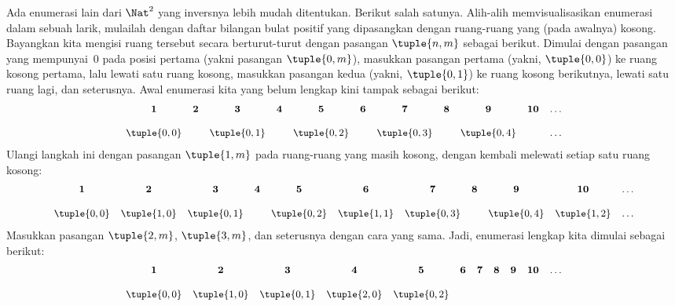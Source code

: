 \documentclass[../../../include/open-logic-section]{subfiles}
\begin{document}


\begin{explain}
Ada enumerasi lain dari $\Nat^2$ yang inversnya lebih mudah ditentukan. Berikut
salah satunya. Alih-alih memvisualisasikan enumerasi dalam sebuah larik,
mulailah dengan daftar bilangan bulat positif yang dipasangkan dengan
ruang-ruang yang (pada awalnya) kosong. Bayangkan kita mengisi ruang tersebut
secara berturut-turut dengan pasangan $\tuple{n,m}$ sebagai berikut. Dimulai
dengan pasangan yang mempunyai~$0$ pada posisi pertama (yakni pasangan
$\tuple{0,m}$), masukkan pasangan pertama (yakni, $\tuple{0,0}$) ke ruang
kosong pertama, lalu lewati satu ruang kosong, masukkan pasangan kedua (yakni,
$\tuple{0,1}$) ke ruang kosong berikutnya, lewati satu ruang lagi, dan
seterusnya. Awal enumerasi kita yang belum lengkap kini tampak sebagai berikut:
\[\small
\begin{array}{@{}c c c c c c c c c c c@{}}
\mathbf 1 & \mathbf 2 & \mathbf 3 & \mathbf 4 & \mathbf 5 & \mathbf 6 & \mathbf 7 & \mathbf 8 & \mathbf 9 & \mathbf{10} & \dots \\ \\
\tuple{0,0} &  & \tuple{0,1} &  & \tuple{0,2} &  & \tuple{0,3} & & \tuple{0,4} &  & \dots \\
\end{array}
\]
Ulangi langkah ini dengan pasangan $\tuple{1,m}$ pada ruang-ruang yang masih
kosong, dengan kembali melewati setiap satu ruang kosong:
\[\small
\begin{array}{@{}c c c c c c c c c c c@{}}
\mathbf 1 & \mathbf 2 & \mathbf 3 & \mathbf 4 & \mathbf 5 & \mathbf 6 & \mathbf 7 & \mathbf 8 & \mathbf 9 & \mathbf{10} & \dots \\ \\
\tuple{0,0} & \tuple{1,0} & \tuple{0,1} &  & \tuple{0,2} & \tuple{1,1} &
\tuple{0,3} & & \tuple{0,4} &  \tuple{1,2} & \dots \\
\end{array}
\]
Masukkan pasangan $\tuple{2,m}$, $\tuple{3,m}$, dan seterusnya dengan cara
yang sama. Jadi, enumerasi lengkap kita dimulai sebagai berikut:
\[\small
\begin{array}{@{}cc c c c c c c c c c@{}}
\mathbf 1 & \mathbf 2 & \mathbf 3 & \mathbf 4 & \mathbf 5 & \mathbf 6 & \mathbf 7 & \mathbf 8 & \mathbf 9 & \mathbf{10} & \dots \\ \\
\tuple{0,0} & \tuple{1,0} & \tuple{0,1} & \tuple{2,0}  & \tuple{0,2} &

\end{array}\]
\end{explain}
\end{document}
